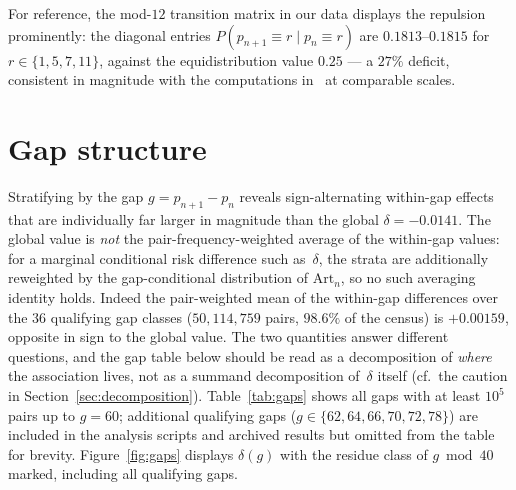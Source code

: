 \documentclass[11pt,reqno]{amsart}
\theoremstyle{plain}
\theoremstyle{definition}
\newcommand{\Art}{\mathrm{Art}}
\begin{document}
For reference, the mod-$12$ transition matrix in our data displays the
repulsion prominently: the diagonal entries
$P(p_{n+1} \equiv r \mid p_n \equiv r)$ are $0.1813$--$0.1815$ for
$r \in \{1, 5, 7, 11\}$, against the equidistribution value $0.25$ --- a
$27\%$ deficit, consistent in magnitude with the computations
in~\cite{LOS2016} at comparable scales.




\section{Gap structure}
\label{sec:gaps}

Stratifying by the gap $g = p_{n+1} - p_n$ reveals sign-alternating
within-gap effects that are individually far larger in magnitude than the
global $\delta = -0.0141$. The global value is \emph{not} the
pair-frequency-weighted average of the within-gap values: for a marginal
conditional risk difference such as~$\delta$, the strata are additionally
reweighted by the gap-conditional distribution of $\Art_n$, so no such
averaging identity holds. Indeed the pair-weighted mean of the within-gap
differences over the $36$ qualifying gap classes ($50{,}114{,}759$ pairs,
$98.6\%$ of the census) is $+0.00159$, opposite in sign to the global value.
The two quantities answer different questions, and the gap table below should
be read as a decomposition of \emph{where} the association lives, not as a
summand decomposition of~$\delta$ itself (cf.\ the caution in
Section~\ref{sec:decomposition}).
Table~\ref{tab:gaps} shows all gaps with at least $10^5$ pairs up to $g = 60$;
additional qualifying gaps ($g \in \{62, 64, 66, 70, 72, 78\}$) are included
in the analysis scripts and archived results but omitted from the table
for brevity.
Figure~\ref{fig:gaps} displays $\delta(g)$ with the residue class of
$g \bmod 40$ marked, including all qualifying gaps.
\end{document}

